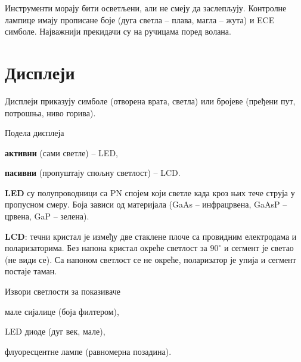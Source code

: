 \documentclass{report}
\begin{document}
Инструменти морају бити осветљени, али не смеју да заслепљују. Контролне
лампице имају прописане боје (дуга светла -- плава, магла -- жута) и ECE
симболе. Најважнији прекидачи су на ручицама поред волана.

\section{Дисплеји}

Дисплеји приказују симболе (отворена врата, светла) или бројеве (пређени пут,
потрошња, ниво горива).

\begin{podela}{Подела дисплеја}
\begin{lista}
    \item \textbf{активни} (сами светле) -- LED,
    \item \textbf{пасивни} (пропуштају спољну светлост) -- LCD.
\end{lista}
\end{podela}

\textbf{LED} су полупроводници са PN спојем који светле када кроз њих тече
струја у пропусном смеру. Боја зависи од материјала (GaAs -- инфрацрвена,
GaAsP -- црвена, GaP -- зелена).

\textbf{LCD}: течни кристал је између две стаклене плоче са провидним
електродама и поларизаторима. Без напона кристал окреће светлост за
$90^\circ$ и сегмент је светао (не види се). Са напоном светлост се не окреће,
поларизатор је упија и сегмент постаје таман.

\begin{podela}{Извори светлости за показиваче}
\begin{lista}
    \item мале сијалице (боја филтером),
    \item LED диоде (дуг век, мале),
    \item флуоресцентне лампе (равномерна позадина).
\end{lista}
\end{podela}
\end{document}
